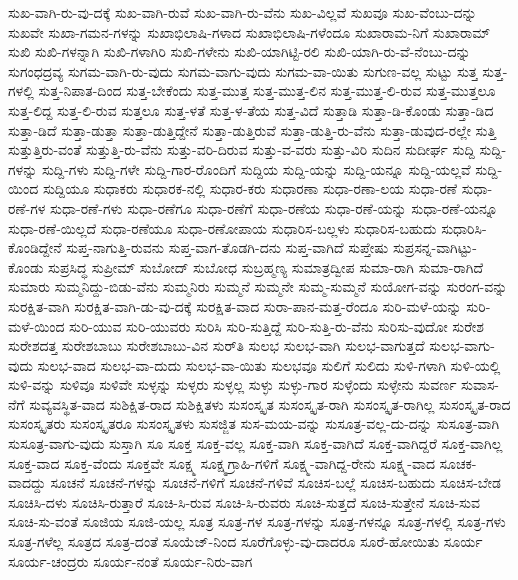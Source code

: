 {ಸುಖ-ವಾಗಿ-ರು-ವು-ದಕ್ಕೆ
ಸುಖ-ವಾಗಿ-ರುವೆ
ಸುಖ-ವಾಗಿ-ರು-ವೆನು
ಸುಖ-ವಿಲ್ಲವೆ
ಸುಖವೂ
ಸುಖ-ವೆಂಬು-ದನ್ನು
ಸುಖವೇ
ಸುಖಾ-ಗಮನ-ಗಳನ್ನು
ಸುಖಾಭಿಲಾಷಿ-ಗಳಾದ
ಸುಖಾಭಿಲಾಷಿ-ಗಳೆಂದೂ
ಸುಖಾರಾಮ-ನಿಗೆ
ಸುಖಾರಾಮ್
ಸುಖಿ
ಸುಖಿ-ಗಳನ್ನಾಗಿ
ಸುಖಿ-ಗಳಾಗಿರಿ
ಸುಖಿ-ಗಳೇನು
ಸುಖಿ-ಯಾಗಿಟ್ಟಿ-ರಲಿ
ಸುಖಿ-ಯಾಗಿ-ರು-ವೆ-ನೆಂಬು-ದನ್ನು
ಸುಗಂಧದ್ರವ್ಯ
ಸುಗಮ-ವಾಗಿ-ರು-ವುದು
ಸುಗಮ-ವಾಗು-ವುದು
ಸುಗಮ-ವಾ-ಯಿತು
ಸುಗುಣ-ವಲ್ಲ
ಸುಟ್ಟು
ಸುತ್ತ
ಸುತ್ತ-ಗಳಲ್ಲಿ
ಸುತ್ತ-ನಿಪಾತ-ದಿಂದ
ಸುತ್ತ-ಬೇಕೆಂದು
ಸುತ್ತ-ಮುತ್ತ
ಸುತ್ತ-ಮುತ್ತ-ಲಿನ
ಸುತ್ತ-ಮುತ್ತ-ಲಿ-ರುವ
ಸುತ್ತ-ಮುತ್ತಲೂ
ಸುತ್ತ-ಲಿದ್ದ
ಸುತ್ತ-ಲಿ-ರುವ
ಸುತ್ತಲೂ
ಸುತ್ತ-ಳತೆ
ಸುತ್ತ-ಳ-ತೆಯ
ಸುತ್ತ-ವಿದೆ
ಸುತ್ತಾಡಿ
ಸುತ್ತಾ-ಡಿ-ಕೊಂಡು
ಸುತ್ತಾ-ಡಿದ
ಸುತ್ತಾ-ಡಿದೆ
ಸುತ್ತಾ-ಡುತ್ತಾ
ಸುತ್ತಾ-ಡುತ್ತಿದ್ದೇನೆ
ಸುತ್ತಾ-ಡುತ್ತಿರುವೆ
ಸುತ್ತಾ-ಡುತ್ತಿ-ರು-ವೆನು
ಸುತ್ತಾ-ಡುವುದ-ರಲ್ಲೇ
ಸುತ್ತಿ
ಸುತ್ತುತ್ತಿರು-ವಂತೆ
ಸುತ್ತುತ್ತಿ-ರು-ವೆನು
ಸುತ್ತು-ವರಿ-ದಿರುವ
ಸುತ್ತು-ವ-ವರು
ಸುತ್ತು-ವಿರಿ
ಸುದಿನ
ಸುದೀರ್ಘ
ಸುದ್ದಿ
ಸುದ್ದಿ-ಗಳನ್ನು
ಸುದ್ದಿ-ಗಳು
ಸುದ್ದಿ-ಗಳೇ
ಸುದ್ದಿ-ಗಾರ-ರೊಂದಿಗೆ
ಸುದ್ದಿಯ
ಸುದ್ದಿ-ಯನ್ನು
ಸುದ್ದಿ-ಯನ್ನೂ
ಸುದ್ದಿ-ಯಲ್ಲವೆ
ಸುದ್ದಿ-ಯಿಂದ
ಸುದ್ದಿಯೂ
ಸುಧಾಕರು
ಸುಧಾರಕ-ನಲ್ಲಿ
ಸುಧಾರ-ಕರು
ಸುಧಾರಣಾ
ಸುಧಾ-ರಣಾ-ಲಯ
ಸುಧಾ-ರಣೆ
ಸುಧಾ-ರಣೆ-ಗಳ
ಸುಧಾ-ರಣೆ-ಗಳು
ಸುಧಾ-ರಣೆಗೂ
ಸುಧಾ-ರಣೆಗೆ
ಸುಧಾ-ರಣೆಯ
ಸುಧಾ-ರಣೆ-ಯನ್ನು
ಸುಧಾ-ರಣೆ-ಯನ್ನೂ
ಸುಧಾ-ರಣೆ-ಯಿಲ್ಲದೆ
ಸುಧಾ-ರಣೆಯೂ
ಸುಧಾ-ರಣೋಪಾಯ
ಸುಧಾರಿಸ-ಬಲ್ಲಳು
ಸುಧಾರಿಸ-ಬಹುದು
ಸುಧಾರಿಸಿ-ಕೊಂಡಿದ್ದೇನೆ
ಸುಪ್ತ-ನಾಗುತ್ತಿ-ರುವನು
ಸುಪ್ತ-ವಾಗ-ತೊಡಗಿ-ದನು
ಸುಪ್ತ-ವಾಗಿದೆ
ಸುಪ್ತೇಷು
ಸುಪ್ರಸನ್ನ-ವಾಗಿಟ್ಟು-ಕೊಂಡು
ಸುಪ್ರಸಿದ್ಧ
ಸುಪ್ರೀಮ್
ಸುಬೋದ್
ಸುಬೋಧ
ಸುಬ್ರಹ್ಮಣ್ಯ
ಸುಮಾತ್ರದ್ವೀಪ
ಸುಮಾ-ರಾಗಿ
ಸುಮಾ-ರಾಗಿದೆ
ಸುಮಾರು
ಸುಮ್ಮನಿದ್ದು-ಬಿಡು-ವೆನು
ಸುಮ್ಮನಿರು
ಸುಮ್ಮನೆ
ಸುಮ್ಮನೇ
ಸುಮ್ಮ-ಸುಮ್ಮನೆ
ಸುಯೋಗ-ವನ್ನು
ಸುರಂಗ-ವನ್ನು
ಸುರಕ್ಷಿತ-ವಾಗಿ
ಸುರಕ್ಷಿತ-ವಾಗಿ-ಡು-ವು-ದಕ್ಕೆ
ಸುರಕ್ಷಿತ-ವಾದ
ಸುರಾ-ಪಾನ-ಮತ್ತ-ರೆಂದೂ
ಸುರಿ-ಮಳೆ-ಯನ್ನು
ಸುರಿ-ಮಳೆ-ಯಿಂದ
ಸುರಿ-ಯುವ
ಸುರಿ-ಯುವರು
ಸುರಿಸಿ
ಸುರಿ-ಸುತ್ತಿದ್ದೆ
ಸುರಿ-ಸುತ್ತಿ-ರು-ವೆನು
ಸುರಿಸು-ವುದೋ
ಸುರೇಶ
ಸುರೇಶದತ್ತ
ಸುರೇಶಬಾಬು
ಸುರೇಶಬಾಬು-ವಿನ
ಸುರ್‌ತಿ
ಸುಲಭ
ಸುಲಭ-ವಾಗಿ
ಸುಲಭ-ವಾಗುತ್ತದೆ
ಸುಲಭ-ವಾಗು-ವುದು
ಸುಲಭ-ವಾದ
ಸುಲಭ-ವಾ-ದುದು
ಸುಲಭ-ವಾ-ಯಿತು
ಸುಲಭವೂ
ಸುಲಿಗೆ
ಸುಲಿದು
ಸುಳಿ-ಗಳಾಗಿ
ಸುಳಿ-ಯಲ್ಲಿ
ಸುಳಿ-ವನ್ನು
ಸುಳಿವೂ
ಸುಳಿವೇ
ಸುಳ್ಳನ್ನು
ಸುಳ್ಳರು
ಸುಳ್ಳಲ್ಲ
ಸುಳ್ಳು
ಸುಳ್ಳು-ಗಾರ
ಸುಳ್ಳೆಂದು
ಸುಳ್ಳೇನು
ಸುವರ್ಣ
ಸುವಾಸ-ನೆಗೆ
ಸುವ್ಯವಸ್ಥಿತ-ವಾದ
ಸುಶಿಕ್ಷಿತ-ರಾದ
ಸುಶಿಕ್ಷಿತಳು
ಸುಸಂಸ್ಕೃತ
ಸುಸಂಸ್ಕೃತ-ರಾಗಿ
ಸುಸಂಸ್ಕೃತ-ರಾಗಿಲ್ಲ
ಸುಸಂಸ್ಕೃತ-ರಾದ
ಸುಸಂಸ್ಕೃತರು
ಸುಸಂಸ್ಕೃತರೂ
ಸುಸಂಸ್ಕೃತಳು
ಸುಸಜ್ಜಿತ
ಸುಸ-ಮಯ-ವನ್ನು
ಸುಸೂತ್ರ-ವಲ್ಲ-ದು-ದನ್ನು
ಸುಸೂತ್ರ-ವಾಗಿ
ಸುಸೂತ್ರ-ವಾಗು-ವುದು
ಸುಸ್ತಾಗಿ
ಸೂ
ಸೂಕ್ತ
ಸೂಕ್ತ-ವಲ್ಲ
ಸೂಕ್ತ-ವಾಗಿ
ಸೂಕ್ತ-ವಾಗಿದೆ
ಸೂಕ್ತ-ವಾಗಿದ್ದರೆ
ಸೂಕ್ತ-ವಾಗಿಲ್ಲ
ಸೂಕ್ತ-ವಾದ
ಸೂಕ್ತ-ವೆಂದು
ಸೂಕ್ತವೇ
ಸೂಕ್ಷ್ಮ
ಸೂಕ್ಷ್ಮಗ್ರಾಹಿ-ಗಳಿಗೆ
ಸೂಕ್ಷ್ಮ-ವಾಗಿದ್ದ-ರೇನು
ಸೂಕ್ಷ್ಮ-ವಾದ
ಸೂಚಕ-ವಾದದ್ದು
ಸೂಚನೆ
ಸೂಚನೆ-ಗಳನ್ನು
ಸೂಚನೆ-ಗಳಿಗೆ
ಸೂಚನೆ-ಗಳಿವೆ
ಸೂಚಿಸ-ಬಲ್ಲೆ
ಸೂಚಿಸ-ಬಹುದು
ಸೂಚಿಸ-ಬೇಡ
ಸೂಚಿಸಿ-ದಳು
ಸೂಚಿಸಿ-ರುತ್ತಾರೆ
ಸೂಚಿ-ಸಿ-ರುವ
ಸೂಚಿ-ಸಿ-ರುವರು
ಸೂಚಿ-ಸುತ್ತದೆ
ಸೂಚಿ-ಸುತ್ತೇನೆ
ಸೂಚಿ-ಸುವ
ಸೂಚಿ-ಸು-ವಂತೆ
ಸೂಜಿಯ
ಸೂಜಿ-ಯಲ್ಲ
ಸೂತ್ರ
ಸೂತ್ರ-ಗಳ
ಸೂತ್ರ-ಗಳನ್ನು
ಸೂತ್ರ-ಗಳನ್ನೂ
ಸೂತ್ರ-ಗಳಲ್ಲಿ
ಸೂತ್ರ-ಗಳು
ಸೂತ್ರ-ಗಳೆಲ್ಲ
ಸೂತ್ರದ
ಸೂತ್ರ-ದಂತೆ
ಸೂಯೆಜ್‌-ನಿಂದ
ಸೂರೆಗೊಳ್ಳು-ವು-ದಾದರೂ
ಸೂರೆ-ಹೋಯಿತು
ಸೂರ್ಯ
ಸೂರ್ಯ-ಚಂದ್ರರು
ಸೂರ್ಯ-ನಂತೆ
ಸೂರ್ಯ-ನಿರು-ವಾಗ
}
